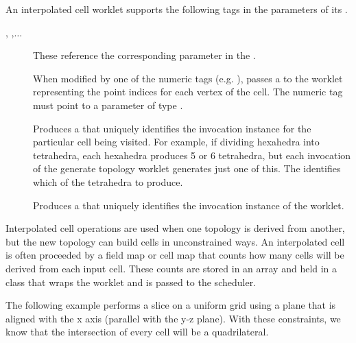 An interpolated cell worklet supports the following tags in the parameters
of its \executionsignature.
\begin{description}
\item[, ,$\ldots$] These reference the
  corresponding parameter in the \controlsignature.
\item[] When modified by one of the numeric tags
  (e.g. ), passes a  to the
  worklet representing the point indices for each vertex of the cell. The
  numeric tag must point to a \controlsignature parameter of type
  .
\item[] Produces a  that uniquely identifies the
  invocation instance for the particular cell being visited. For example,
  if dividing hexahedra into tetrahedra, each hexahedra produces 5 or 6
  tetrahedra, but each invocation of the generate topology worklet
  generates just one of this. The  identifies which of the
  tetrahedra to produce.
\item[] Produces a  that uniquely identifies the
  invocation instance of the worklet.
\end{description}

Interpolated cell operations are used when one topology is derived from
another, but the new topology can build cells in unconstrained ways. An
interpolated cell is often proceeded by a field map or cell map that counts
how many cells will be derived from each input cell. These counts are
stored in an array and held in a  class
that wraps the worklet and is passed to the scheduler. 

The following example performs a slice on a uniform grid using a plane that
is aligned with the x axis (parallel with the y-z plane). With these
constraints, we know that the intersection of every cell will be a
quadrilateral.

